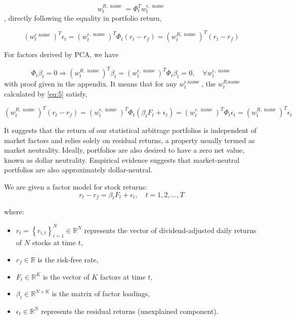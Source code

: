 \documentclass[12pt,article]{memoir}
\begin{document}
\begin{equation}\label{eq:5}
	w_t^{R, \text { name }}=\Phi_t^T w_t^{\epsilon, \text { name }}
\end{equation}
, directly following the equality in portfolio return,

\begin{equation}\label{eq:6}
	\left(w_t^{\epsilon \text { name }}\right)^T \epsilon_t=\left(w_t^{\epsilon, \text { name }}\right)^T \Phi_t\left(r_t-r_f\right)=\left(w_t^{R, \text { name }}\right)^T\left(r_t-r_f\right)
\end{equation}

For factors derived by PCA, we have

\begin{equation}\label{eq:7}
	\Phi_t \beta_t=0 \Longrightarrow\left(w_t^{R, \text { name }}\right)^T \beta_t=\left(w_t^{\epsilon, \text { name }}\right)^T \Phi_t \beta_t=0, \quad \forall w_t^{\epsilon, \text { name }}
\end{equation}
with proof given in the appendix. It means that for any $w_t^{\epsilon \text {,name }}$, the $w_t^{R \text {,name }}$ calculated by \cref{eq:5} satisfy,

\begin{equation}\label{eq:8}
	\left(w_t^{R, \text { name }}\right)^T\left(r_t-r_f\right)=\left(w_t^{\epsilon, \text { name }}\right)^T \Phi_t\left(\beta_t F_t+\epsilon_t\right)=\left(w_t^{\epsilon, \text { name }}\right)^T \Phi_t \epsilon_t=\left(w_t^{R, \text { name }}\right)^T \epsilon_t
\end{equation}

It suggests that the return of our statistical arbitrage portfolios is independent of market factors and relies solely on residual returns, a property usually termed as market neutrality. Ideally, portfolios are also desired to have a zero net value, known as dollar neutrality. Empirical evidence suggests that market-neutral portfolios are also approximately dollar-neutral.

\Vhrulefill

We are given a factor model for stock returns:
$$
r_t-r_f=\beta_t F_t+\epsilon_t, \quad t=1,2, \ldots, T
$$

where:
\begin{itemize}
  \item $r_t=\left\{r_{i, t}\right\}_{i=1}^N \in \mathbb{R}^N$ represents the vector of dividend-adjusted daily returns of $N$ stocks at time $t$,
  \item $r_f \in \mathbb{R}$ is the risk-free rate,
  \item $F_t \in \mathbb{R}^K$ is the vector of $K$ factors at time $t$,
  \item $\beta_t \in \mathbb{R}^{N \times K}$ is the matrix of factor loadings,
  \item $\epsilon_t \in \mathbb{R}^N$ represents the residual returns (unexplained component).
\end{itemize}
\end{document}
